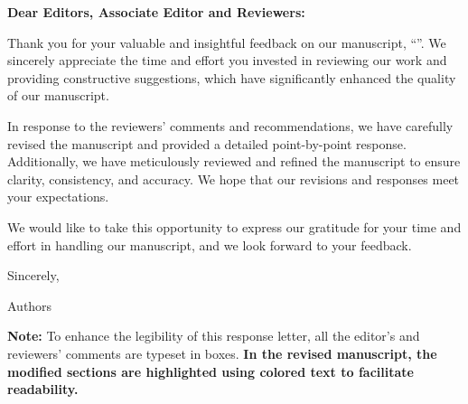 \thispagestyle{empty}
\clearpage
{}
{}

\noindent \textbf{Dear Editors, Associate Editor and Reviewers:}
\vspace{0.5em}

Thank you for your valuable and insightful feedback on our manuscript, ``{\textit{\thetitle}}''. We sincerely appreciate the time and effort you invested in reviewing our work and providing constructive suggestions, which have significantly enhanced the quality of our manuscript.  

In response to the reviewers' comments and recommendations, we have carefully revised the manuscript and provided a detailed point-by-point response. Additionally, we have meticulously reviewed and refined the manuscript to ensure clarity, consistency, and accuracy. We hope that our revisions and responses meet your expectations.  

We would like to take this opportunity to express our gratitude for your time and effort in handling our manuscript, and we look forward to your feedback.

\vspace{8em}

\noindent Sincerely,

\noindent Authors

\vfill
\textbf{Note:} To enhance the legibility of this response letter, all the editor's and reviewers' comments are typeset in boxes. \textbf{In the revised manuscript, the modified sections are highlighted using colored text to facilitate readability.}